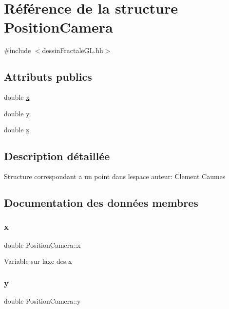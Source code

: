 \hypertarget{structPositionCamera}{}\section{Référence de la structure Position\+Camera}
\label{structPositionCamera}


{\ttfamily \#include $<$dessin\+Fractale\+G\+L.\+hh$>$}

\subsection*{Attributs publics}
\begin{DoxyCompactItemize}
\item 
double \hyperlink{structPositionCamera_ae2c491f8a2804e006bfd2a1f76da53e4}{x}
\item 
double \hyperlink{structPositionCamera_a928a61f17b450c70547403eaea1ab90b}{y}
\item 
double \hyperlink{structPositionCamera_a9fb67025a4671b1f975bef76eb7ad1bb}{z}
\end{DoxyCompactItemize}


\subsection{Description détaillée}
Structure correspondant a un point dans l\textquotesingle{}espace auteur\+: Clement Caumes 

\subsection{Documentation des données membres}
\mbox{\label{structPositionCamera_ae2c491f8a2804e006bfd2a1f76da53e4}} 
\subsubsection{\texorpdfstring{x}{x}}
{\footnotesize\ttfamily double Position\+Camera\+::x}

Variable sur l\textquotesingle{}axe des x \mbox{\label{structPositionCamera_a928a61f17b450c70547403eaea1ab90b}} 
\subsubsection{\texorpdfstring{y}{y}}
{\footnotesize\ttfamily double Position\+Camera\+::y}

